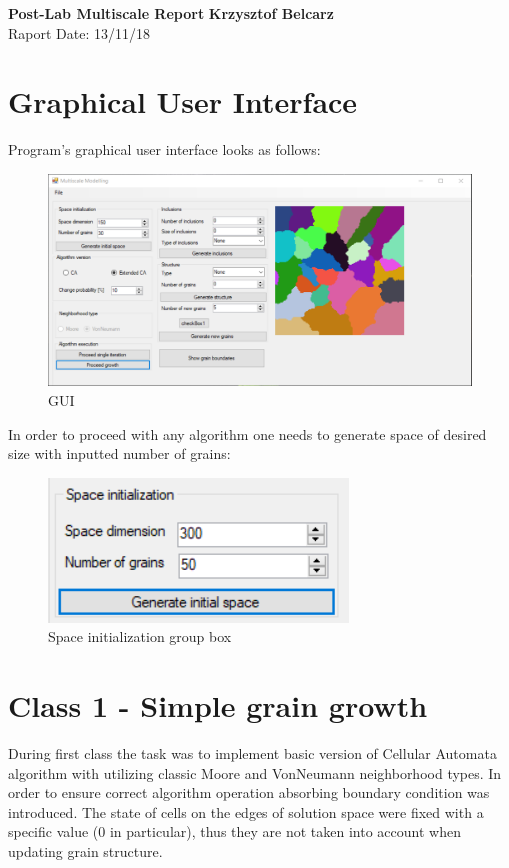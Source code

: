 \documentclass[a4paper, 11pt]{article}
\begin{document}
\noindent
\large\textbf{Post-Lab Multiscale Report} \hfill \textbf{Krzysztof Belcarz} \\
 \hfill Raport Date: 13/11/18 

\section*{Graphical User Interface}
Program's graphical user interface looks as follows:
\begin{figure}[H]
\centering
  \includegraphics[width=\linewidth]{GUI}
  \caption{GUI}
  \label{fig:boat1}
\end{figure}
In order to proceed with any algorithm one needs to generate space of desired size with inputted number of grains:
\begin{figure}[H]
\centering
  \includegraphics{SpaceInit}
  \caption{Space initialization group box}
  \label{fig:boat1}
\end{figure}
\section*{Class 1 - Simple grain growth}
During first class the task was to implement basic version of Cellular Automata algorithm with utilizing classic Moore and VonNeumann neighborhood types. In order to ensure correct algorithm operation absorbing boundary condition was introduced. The state of cells on the edges of solution space were fixed with a specific value (0 in particular), thus they are not taken into account when updating grain structure.
\end{document}
